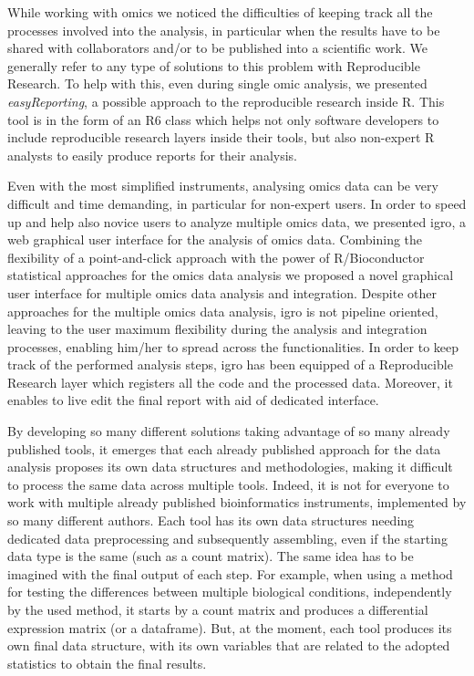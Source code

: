 While working with omics we noticed the difficulties of keeping track all the processes involved into the analysis, in particular when the results have to be shared with collaborators and/or to be published into a scientific work.
We generally refer to any type of solutions to this problem with Reproducible Research.
To help with this, even during single omic analysis, we presented \textit{easyReporting}, a possible approach to the reproducible research inside R.
This tool is in the form of an R6 class which helps not only software developers to include reproducible research layers inside their tools, but also non-expert R analysts to easily produce reports for their analysis.

Even with the most simplified instruments, analysing omics data can be very difficult and time demanding, in particular for non-expert users.
In order to speed up and help also novice users to analyze multiple omics data, we presented \gls{igro}, a web graphical user interface for the analysis of omics data.
Combining the flexibility of a point-and-click approach with the power of R/Bioconductor statistical approaches for the omics data analysis we proposed a novel graphical user interface for multiple omics data analysis and integration.
Despite other approaches for the multiple omics data analysis, \gls{igro} is not pipeline oriented, leaving to the user maximum flexibility during the analysis and integration processes, enabling him/her to spread across the functionalities.
In order to keep track of the performed analysis steps, \gls{igro} has been equipped of a Reproducible Research layer which registers all the code and the processed data.
Moreover, it enables to live edit the final report with aid of dedicated interface.

By developing so many different solutions taking advantage of so many already published tools, it emerges that each already published approach for the data analysis proposes its own data structures and methodologies, making it difficult to process the same data across multiple tools.
Indeed, it is not for everyone to work with multiple already published bioinformatics instruments, implemented by so many different authors.
Each tool has its own data structures needing dedicated data preprocessing and subsequently assembling, even if the starting data type is the same (such as a count matrix).
The same idea has to be imagined with the final output of each step.
For example, when using a method for testing the differences between multiple biological conditions, independently by the used method, it starts by a count matrix and produces a differential expression matrix (or a dataframe).
But, at the moment, each tool produces its own final data structure, with its own variables that are related to the adopted statistics to obtain the final results.

